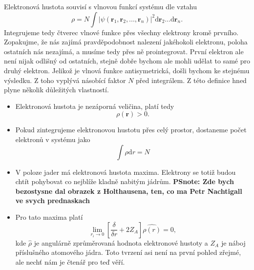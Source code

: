 Elektronová hustota souvisí s vlnovou funkcí systému dle vztahu
\begin{equation}
\rho=N \int |\psi(\textbf{r}_1,\textbf{r}_2,...,\textbf{r}_n)|^2 \mathrm{d}\textbf{r}_2\dots\mathrm{d}\textbf{r}_n .
\label{rov:dft:defrho}
\end{equation}
Integrujeme tedy čtverec vlnové funkce přes všechny elektrony kromě prvního. Zopakujme, že nás zajímá pravděpodobnost nalezení jakéhokoli elektronu, poloha ostatních nás nezajímá, a musíme tedy přes ně prointegrovat. První elektron ale není nijak odlišný od ostatních, stejně dobře bychom ale mohli udělat to samé pro druhý elektron. Jelikož je vlnová funkce antisymetrická, došli bychom ke stejnému výsledku. Z toho vyplývá násobící faktor $N$ před integrálem.
Z této definice hned plyne několik důležitých vlastností.

\begin{itemize}
\item Elektronová hustota je nezáporná veličina, platí tedy
\begin{equation}
\rho(\mathbf{r})  > 0 .
\end{equation}
\item Pokud zintegrujeme elektronovou hustotu přes celý prostor, dostaneme počet elektronů v systému jako
\begin{equation}
\int \rho\mathrm{d}r = N
\end{equation}

\item V poloze jader má elektronová hustota maxima. Elektrony se totiž budou chtít pohybovat co nejblíže kladně nabitým jádrům. \textbf{PSnote: Zde bych bezostysne dal obrazek z Holthausena, ten, co ma Petr Nachtigall ve svych prednaskach}
\item Pro tato maxima platí
\begin{equation}
\lim_{r_i \to 0} \left[ \frac{\delta}{\delta r}+2Z_A\right]\hat{\rho(r)}=0, 
\end{equation}
kde $\hat{\rho}$ je angulárně zprůměrovaná hodnota elektronové hustoty a $Z_A$ je náboj příslušného atomového jádra. Toto tvrzení asi není na první pohled zřejmé, ale nechť nám je čtenář pro teď věří.
\end{itemize}

